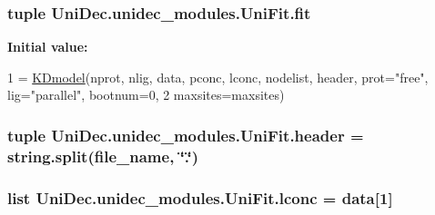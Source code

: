 \subsubsection[{fit}]{\setlength{\rightskip}{0pt plus 5cm}tuple Uni\+Dec.\+unidec\+\_\+modules.\+Uni\+Fit.\+fit}\label{namespace_uni_dec_1_1unidec__modules_1_1_uni_fit_ab1b39827451f2bcc9597208bf596f27c}
{\bfseries Initial value\+:}
\begin{DoxyCode}
1 = \hyperlink{class_uni_dec_1_1unidec__modules_1_1_uni_fit_1_1_k_dmodel}{KDmodel}(nprot, nlig, data, pconc, lconc, nodelist, header, prot=\textcolor{stringliteral}{"free"}, lig=\textcolor{stringliteral}{"parallel"}, bootnum=0,
2                   maxsites=maxsites)
\end{DoxyCode}
\hypertarget{namespace_uni_dec_1_1unidec__modules_1_1_uni_fit_a860b66bfa0196156348351a1d21ea83f}{}
\subsubsection[{header}]{\setlength{\rightskip}{0pt plus 5cm}tuple Uni\+Dec.\+unidec\+\_\+modules.\+Uni\+Fit.\+header = string.\+split({\bf file\+\_\+name}, \char`\"{}.\char`\"{})}\label{namespace_uni_dec_1_1unidec__modules_1_1_uni_fit_a860b66bfa0196156348351a1d21ea83f}
\hypertarget{namespace_uni_dec_1_1unidec__modules_1_1_uni_fit_a86d9ea39b15b86dde182abb7c19e97a6}{}
\subsubsection[{lconc}]{\setlength{\rightskip}{0pt plus 5cm}list Uni\+Dec.\+unidec\+\_\+modules.\+Uni\+Fit.\+lconc = {\bf data}\mbox{[}1\mbox{]}}\label{namespace_uni_dec_1_1unidec__modules_1_1_uni_fit_a86d9ea39b15b86dde182abb7c19e97a6}
\hypertarget{namespace_uni_dec_1_1unidec__modules_1_1_uni_fit_aec3e21630fd7258433cc8e09de27b78a}{}
